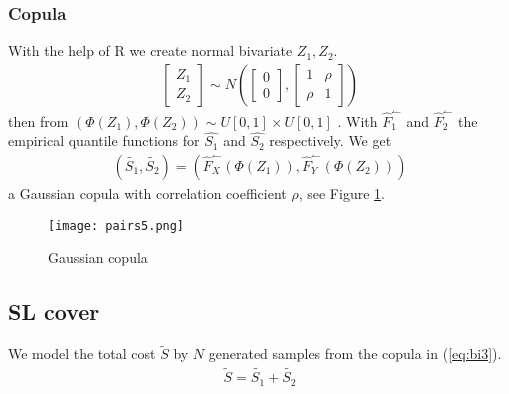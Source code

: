 \documentclass[11pt]{article}
\begin{document}
\subsubsection*{Copula}
With the help of R 
we create normal bivariate $Z_1,Z_2$.
\begin{align} \label{eq:bi1}
	 \begin{bmatrix} Z_1 \\ Z_2\end{bmatrix} \sim N\left(\begin{bmatrix} 0 \\ 0\end{bmatrix},\begin{bmatrix} 1&\rho \\ \rho&1\end{bmatrix}\right)
\end{align}
then from   $\left(\Phi(Z_1),\Phi(Z_2)\right) \sim  U[0,1] \times U[0,1]$ .
With $\hat{F}_1^\leftharpoonup$ and $\hat{F}_2^\leftharpoonup$ the empirical quantile functions for $\hat{S_1}$ and $\hat{S_2}$ respectively.
We get
\begin{align} \label{eq:bi3}
	  \left(\tilde{S_1},\tilde{S_2}\right) = \left(\hat{F}_X^\leftharpoonup(\Phi(Z_1)),\hat{F}_Y^\leftharpoonup(\Phi(Z_2))\right) 
\end{align}
a Gaussian copula with correlation coefficient $ \rho$, see Figure \ref{fig:copula}.

 \begin{figure}[h]
 \center
  \texttt{[image: pairs5.png]}
  \caption{Gaussian copula}
  \label{fig:copula}
\end{figure}



\subsection*{SL cover}
We model the total cost $\tilde{S}$ by $N$ generated samples from the copula in (\ref{eq:bi3}).
\begin{align*} 
	\tilde{S}= \tilde{S_1} + \tilde{S_2}
\end{align*}
\end{document}

